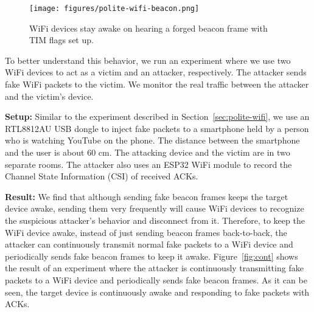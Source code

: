\begin{figure}[!t]
    \centering
    \texttt{[image: figures/polite-wifi-beacon.png]}
    \caption{WiFi devices stay awake on hearing a forged beacon frame with TIM flags set up.}
    \label{fig:polite-wifi-beacon}
\end{figure}

To better understand this behavior, we run an experiment where we use two WiFi devices to act as a victim and an attacker, respectively. The attacker sends fake WiFi packets to the victim. We monitor the real traffic between the attacker and the victim's device.

\vspace{0.05in}
\noindent
\textbf{Setup:} Similar to the experiment described in Section~\ref{sec:polite-wifi}, we use an RTL8812AU USB dongle to inject fake packets to a smartphone held by a person who is watching YouTube on the phone. The distance between the smartphone and the user is about 60 cm. The attacking device and the victim are in two separate rooms. The attacker also uses an ESP32 WiFi module to record the Channel State Information (CSI) of received ACKs. 

\vspace{0.05in}
\noindent
\textbf{Result:}
We find that although sending fake beacon frames keeps the target device awake, sending them very frequently will cause WiFi devices to recognize the suspicious attacker's behavior and disconnect from it. Therefore, to keep the WiFi device awake, instead of just sending beacon frames back-to-back, the attacker can continuously transmit normal fake packets to a WiFi device and periodically sends fake beacon frames to keep it awake. Figure~\ref{fig:cont} shows the result of an experiment where the attacker is continuously transmitting fake packets to a WiFi device and periodically sends fake beacon frames. As it can be seen, the target device is continuously awake and responding to fake packets with ACKs. %



